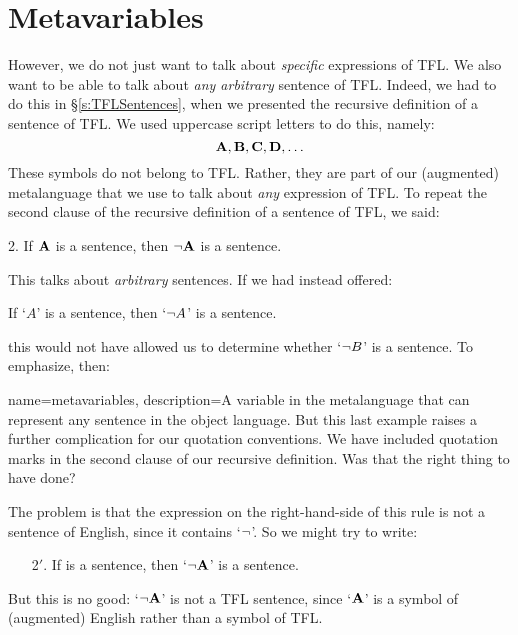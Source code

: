 \section{Metavariables}
However, we do not just want to talk about \emph{specific} expressions of TFL. We also want to be able to talk about \emph{any arbitrary} sentence of TFL. Indeed, we had to do this in \S\ref{s:TFLSentences}, when we presented the recursive definition of a sentence of TFL. We used uppercase script letters to do this, namely:
	$$\mathbf{A}, \mathbf{B}, \mathbf{C}, \mathbf{D}, \ldots$$
These symbols do not belong to TFL. Rather, they are part of our (augmented) metalanguage that we use to talk about \emph{any} expression of TFL. To repeat the second clause of the recursive definition of a sentence of TFL, we said:
	\begin{earg}
		\item[2.] If $\mathbf{A}$ is a sentence, then $\neg \mathbf{A}$ is a sentence.
	\end{earg}
This talks about \emph{arbitrary} sentences. If we had instead offered:
	\begin{ebullet}
		\item If `$A$' is a sentence, then `$\neg A$' is a sentence.
	\end{ebullet}
this would not have allowed us to determine whether `$\neg B$' is a sentence. To emphasize, then:

{
name=metavariables,
description={A variable in the metalanguage that can represent any sentence in the object language.}
}
But this last example raises a further complication for our quotation conventions. We have included quotation marks in the second clause of our recursive definition. Was that the right thing to have done?

The problem is that the expression on the right-hand-side of this rule is not a sentence of English, since it contains `$\neg$'. So we might try to write:
	\begin{enumerate}
		\item[2$'$.] If  is a sentence, then `$\neg \mathbf{A}$' is a sentence.
	\end{enumerate}
But this is no good: `$\neg \mathbf{A}$' is not a TFL sentence, since `$\mathbf{A}$' is a symbol of (augmented) English rather than a symbol of TFL.

